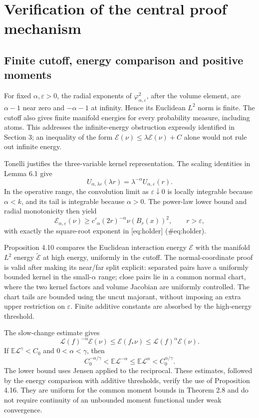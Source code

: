 \documentclass[10pt]{article}
\begin{document}
\section*{Verification of the central proof mechanism}
\subsection*{Finite cutoff, energy comparison and positive moments}
For fixed \(\alpha,\varepsilon>0\), the radial exponents of \(\varphi_{\alpha,\varepsilon}^2\), after the volume element, are \(\alpha-1\) near zero and \(-\alpha-1\) at infinity. Hence its Euclidean \(L^2\) norm is finite. The cutoff also gives finite manifold energies for every probability measure, including atoms. This addresses the infinite-energy obstruction expressly identified in Section 3; an inequality of the form \(\mathcal E(\nu)\le\lambda\mathcal E(\nu)+C\) alone would not rule out infinite energy.\par
Tonelli justifies the three-variable kernel representation. The scaling identities in Lemma 6.1 give \[U_{\alpha,\lambda\varepsilon}(\lambda r)
 =\lambda^{-\alpha}U_{\alpha,\varepsilon}(r).\] In the operative range, the convolution limit as \(\varepsilon\downarrow0\) is locally integrable because \(\alpha<k\), and its tail is integrable because \(\alpha>0\). The power-law lower bound and radial monotonicity then yield \[\mathcal E_{\alpha,\varepsilon}(\nu)
 \ge c'_\alpha(2r)^{-\alpha}\nu(B_r(x))^2,\qquad r>\varepsilon,\] with exactly the square-root exponent in [eq:holder] (\#eq:holder).\par
Proposition 4.10 compares the Euclidean interaction energy \(\mathcal E\) with the manifold \(L^2\) energy \(\widetilde{\mathcal E}\) at high energy, uniformly in the cutoff. The normal-coordinate proof is valid after making its near/far split explicit: separated pairs have a uniformly bounded kernel in the small-\(\alpha\) range; close pairs lie in a common normal chart, where the two kernel factors and volume Jacobian are uniformly controlled. The chart tails are bounded using the uncut majorant, without imposing an extra upper restriction on \(\varepsilon\). Finite additive constants are absorbed by the high-energy threshold.\par
The slow-change estimate gives \[\mathcal L(f)^{-\alpha}\mathcal E(\nu)
 \le\mathcal E(f_*\nu)\le\mathcal L(f)^\alpha\mathcal E(\nu).\] If \(\mathbb E\mathcal L^\gamma<C_0\) and \(0<\alpha<\gamma\), then \[C_0^{-\alpha/\gamma}
 <\mathbb E\mathcal L^{-\alpha}
 \le\mathbb E\mathcal L^\alpha
 <C_0^{\alpha/\gamma}.\] The lower bound uses Jensen applied to the reciprocal. These estimates, followed by the energy comparison with additive thresholds, verify the use of Proposition 4.16. They are uniform for the common moment bounds in Theorem 2.8 and do not require continuity of an unbounded moment functional under weak convergence.\par
\end{document}
